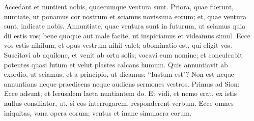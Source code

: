 \begin{biblechapter}
\verse Accedant et nuntient nobis, quaecumque ventura sunt. Priora, quae fuerunt, nuntiate, ut ponamus cor nostrum et sciamus novissima eorum; et, quae ventura sunt, indicate nobis. 
\verse Annuntiate, quae ventura sunt in futurum, ut sciamus quia dii estis vos; bene quoque aut male facite, ut inspiciamus et videamus simul. 
\verse Ecce vos estis nihilum, et opus vestrum nihil valet; abominatio est, qui eligit vos. 
\verse Suscitavi ab aquilone, et venit ab ortu solis; vocavi eum nomine; et conculcabit potentes quasi lutum et velut plastes calcans humum. 
\verse Quis annuntiavit ab exordio, ut sciamus, et a principio, ut dicamus: “Iustum est"? Non est neque annuntians neque praedicens neque audiens sermones vestros. 
\verse Primus ad Sion: Ecce adsunt; et Ierusalem laeta nuntiantem do. 
\verse Et vidi, et nemo erat, ex istis nullus consiliator, ut, si eos interrogarem, responderent verbum. 
\verse Ecce omnes iniquitas, vana opera eorum; ventus et inane simulacra eorum. 
\end{biblechapter}

